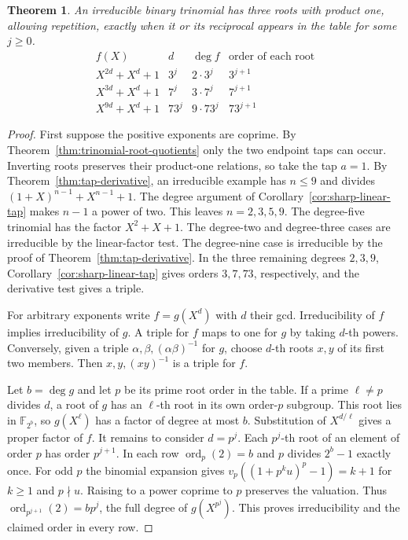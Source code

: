 \documentclass[11pt]{article}
\newtheorem{theorem}{Theorem}
\newcommand{\ord}{\operatorname{ord}}
\begin{document}
\begin{theorem}\label{thm:trinomial-exceptions}
An irreducible binary trinomial has three roots with product one, allowing
repetition, exactly when it or its reciprocal appears in the table
for some \(j\ge0\).
\[
\begin{array}{c|c|c|c}
f(X)&d&\deg f&\text{order of each root}\\ \hline
X^{2d}+X^d+1 & 3^j &2\cdot3^j&3^{j+1}\\
X^{3d}+X^d+1 & 7^j &3\cdot7^j&7^{j+1}\\
X^{9d}+X^d+1 &73^j &9\cdot73^j&73^{j+1}
\end{array}
\]
\end{theorem}
\begin{proof}
First suppose the positive exponents are coprime. By
Theorem~\ref{thm:trinomial-root-quotients} only the two endpoint
taps can occur. Inverting roots preserves their product-one relations,
so take the tap \(a=1\). By Theorem~\ref{thm:tap-derivative},
an irreducible example has \(n\le9\) and divides
\((1+X)^{n-1}+X^{n-1}+1\). The degree argument of
Corollary~\ref{cor:sharp-linear-tap} makes \(n-1\) a power of two.
This leaves \(n=2,3,5,9\). The degree-five trinomial has the factor
\(X^2+X+1\). The degree-two and degree-three cases are irreducible
by the linear-factor test. The degree-nine case is irreducible by
the proof of Theorem~\ref{thm:tap-derivative}.
In the three remaining degrees \(2,3,9\), Corollary~\ref{cor:sharp-linear-tap}
gives orders \(3,7,73\), respectively, and the derivative test gives a triple.

For arbitrary exponents write \(f=g(X^d)\) with \(d\) their gcd.
Irreducibility of \(f\) implies irreducibility of \(g\).
A triple for \(f\) maps to one for \(g\) by taking \(d\)-th powers.
Conversely, given a triple \(\alpha,\beta,(\alpha\beta)^{-1}\) for \(g\),
choose \(d\)-th roots \(x,y\) of its first two members.
Then \(x,y,(xy)^{-1}\) is a triple for \(f\).

Let \(b=\deg g\) and let \(p\) be its prime root order in the table.
If a prime \(\ell\ne p\) divides \(d\), a root of \(g\) has an
\(\ell\)-th root in its own order-\(p\) subgroup. This root lies in
\(\mathbb F_{2^b}\), so \(g(X^\ell)\) has a factor of degree at most \(b\).
Substitution of \(X^{d/\ell}\) gives a proper factor of \(f\).
It remains to consider \(d=p^j\). Each \(p^j\)-th root of an element
of order \(p\) has order \(p^{j+1}\). In each row
\(\ord_p(2)=b\) and \(p\) divides \(2^b-1\) exactly once.
For odd \(p\) the binomial expansion gives
\(v_p((1+p^k u)^p-1)=k+1\) for \(k\ge1\) and \(p\nmid u\).
Raising to a power coprime to \(p\) preserves the valuation.
Thus \(\ord_{p^{j+1}}(2)=bp^j\), the full degree of \(g(X^{p^j})\).
This proves irreducibility and the claimed order in every row.
\end{proof}
\end{document}
